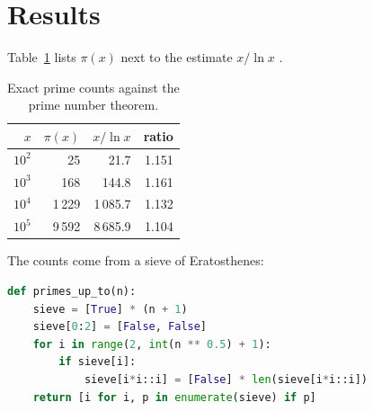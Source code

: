\section{Results}
\label{sec:results}

Table~\ref{tab:counts} lists $\pi(x)$ next to the estimate $x / \ln x$
\citep{hardy2008}.

\begin{table}[h]
  \centering
  \begin{tabular}{rrrr}
    \toprule
    $x$ & $\pi(x)$ & $x / \ln x$ & ratio \\
    \midrule
    $10^2$ & 25     & 21.7     & 1.151 \\
    $10^3$ & 168    & 144.8    & 1.161 \\
    $10^4$ & 1\,229 & 1\,085.7 & 1.132 \\
    $10^5$ & 9\,592 & 8\,685.9 & 1.104 \\
    \bottomrule
  \end{tabular}
  \caption{Exact prime counts against the prime number theorem.}
  \label{tab:counts}
\end{table}

The counts come from a sieve of Eratosthenes:

\begin{lstlisting}[language=Python]
def primes_up_to(n):
    sieve = [True] * (n + 1)
    sieve[0:2] = [False, False]
    for i in range(2, int(n ** 0.5) + 1):
        if sieve[i]:
            sieve[i*i::i] = [False] * len(sieve[i*i::i])
    return [i for i, p in enumerate(sieve) if p]
\end{lstlisting}
